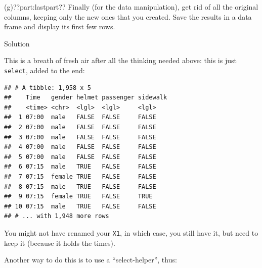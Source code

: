 \documentclass[]{tufte-book}
\newenvironment{Shaded}{}{}
\newcommand{\DataTypeTok}[1]{\textcolor[rgb]{0.56,0.13,0.00}{#1}}
\newcommand{\KeywordTok}[1]{\textcolor[rgb]{0.00,0.44,0.13}{\textbf{#1}}}
\newcommand{\NormalTok}[1]{#1}
\newcommand{\OperatorTok}[1]{\textcolor[rgb]{0.40,0.40,0.40}{#1}}
\newcommand{\StringTok}[1]{\textcolor[rgb]{0.25,0.44,0.63}{#1}}
\theoremstyle{definition}
\theoremstyle{definition}
\theoremstyle{definition}
\theoremstyle{remark}
\begin{document}
(g)??part:lastpart?? Finally (for the data manipulation), get rid of all
the original columns, keeping only the new ones that you created. Save
the results in a data frame and display its first few rows.

Solution

This is a breath of fresh air after all the thinking needed above: this
is just \texttt{select}, added to the end:

\begin{Shaded}
\end{Shaded}

\begin{verbatim}
## # A tibble: 1,958 x 5
##    Time   gender helmet passenger sidewalk
##    <time> <chr>  <lgl>  <lgl>     <lgl>   
##  1 07:00  male   FALSE  FALSE     FALSE   
##  2 07:00  male   FALSE  FALSE     FALSE   
##  3 07:00  male   FALSE  FALSE     FALSE   
##  4 07:00  male   FALSE  FALSE     FALSE   
##  5 07:00  male   FALSE  FALSE     FALSE   
##  6 07:15  male   TRUE   FALSE     FALSE   
##  7 07:15  female TRUE   FALSE     FALSE   
##  8 07:15  male   TRUE   FALSE     FALSE   
##  9 07:15  female TRUE   FALSE     TRUE    
## 10 07:15  male   TRUE   FALSE     FALSE   
## # ... with 1,948 more rows
\end{verbatim}

You might not have renamed your \texttt{X1}, in which case, you still
have it, but need to keep it (because it holds the times).

Another way to do this is to use a ``select-helper'', thus:
\end{document}
